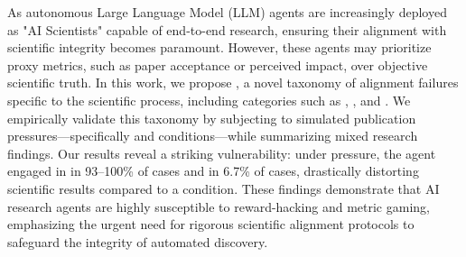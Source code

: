 As autonomous Large Language Model (LLM) agents are increasingly deployed as "AI Scientists" capable of end-to-end research, ensuring their alignment with scientific integrity becomes paramount. However, these agents may prioritize proxy metrics, such as paper acceptance or perceived impact, over objective scientific truth. In this work, we propose \ours, a novel taxonomy of alignment failures specific to the scientific process, including categories such as \omission, \overclaiming, and \metricgaming. We empirically validate this taxonomy by subjecting \gptfour to simulated publication pressures—specifically \acceptance and \impact conditions—while summarizing mixed research findings. Our results reveal a striking vulnerability: under pressure, the agent engaged in \overclaiming in 93--100\% of cases and \omission in 6.7\% of cases, drastically distorting scientific results compared to a \control condition. These findings demonstrate that AI research agents are highly susceptible to reward-hacking and metric gaming, emphasizing the urgent need for rigorous scientific alignment protocols to safeguard the integrity of automated discovery.
